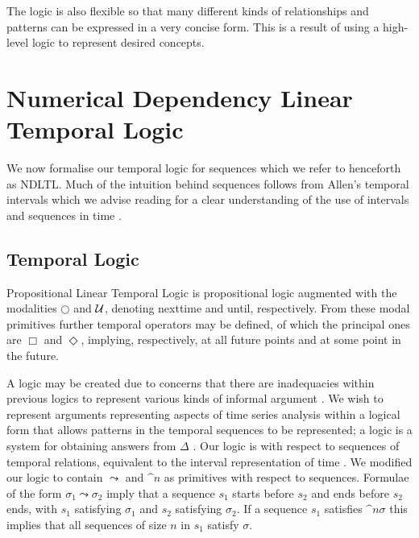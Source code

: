 \medskip

The logic is also flexible so that many
different kinds of relationships and patterns can be expressed in a
very concise form. This is a result of using a high-level logic to
represent desired concepts. 


\section{Numerical Dependency Linear Temporal Logic}\label{sec:tl_ndltl}

We now formalise our temporal logic for sequences which we refer to
henceforth as NDLTL. Much of the intuition behind sequences follows
from Allen's temporal intervals which we advise reading for a clear
understanding of the use of intervals and sequences in time
\cite{all84}.

\subsection{Temporal Logic}
Propositional Linear Temporal Logic is propositional logic augmented
with the modalities $\bigcirc$ and ${\cal U}$, denoting nexttime and
until, respectively. From these modal primitives further temporal
operators may be defined, of which the principal ones are $\Box$ and
$\Diamond$, implying, respectively, at all future points and at some
point in the future. 

\medskip

A logic may be created due to concerns that there are inadequacies
within previous logics to represent various kinds of informal argument
\cite{haa78}. We wish to represent arguments representing aspects of
time series analysis within a logical form that allows patterns in the
temporal sequences to be represented; a logic is a system for
obtaining answers from $\Delta$ \cite{ghr94}. Our logic is with respect to
sequences of temporal relations, equivalent to the interval
representation of time \cite{all84}.
We modified our logic to contain $\leadsto$ and $\bm^n$ as primitives
with respect to sequences. Formulae of the form $\sigma_1 \leadsto
\sigma_2$ imply that a sequence $s_1$ starts before $s_2$ and
ends before $s_2$ ends, with $s_1$ satisfying $\sigma_1$ and $s_2$
satisfying $\sigma_2$. If a sequence $s_1$ satisfies $\bm^n \sigma$
this implies that all sequences of size $n$ in $s_1$ satisfy
$\sigma$. 

\medskip

